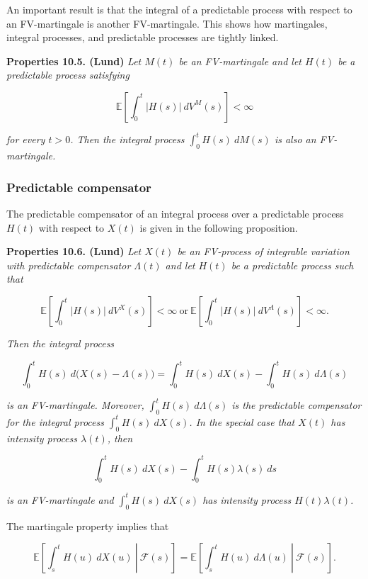 \documentclass[a4paper,10pt,openany]{book}
\begin{document}
An important result is that the integral of a predictable process with respect to an FV-martingale is another FV-martingale. This shows how martingales, integral processes, and predictable processes are tightly linked.

\textbf{Properties 10.5. (Lund)} \emph{Let \(M(t)\) be an FV-martingale and let \(H(t)\) be a predictable process satisfying}

\[
\mathbb E\left[\int_0^t\vert H(s)\vert\ dV^M(s)\right]< \infty
\]

\emph{for every \(t>0\). Then the integral process \(\int_0^t H(s)\ dM(s)\) is also an FV-martingale.}

\hypertarget{predictable-compensator}{%
\subsubsection{Predictable compensator}\label{predictable-compensator}}

The predictable compensator of an integral process over a predictable process \(H(t)\) with respect to \(X(t)\) is given in the following proposition.

\textbf{Properties 10.6. (Lund)} \emph{Let \(X(t)\) be an FV-process of integrable variation with predictable compensator \(\Lambda(t)\) and let \(H(t)\) be a predictable process such that}

\[
\mathbb E\left[\int_0^t\vert H(s)\vert\ dV^X(s)\right]< \infty\ \text{or}\ \mathbb E\left[\int_0^t\vert H(s)\vert\ dV^\Lambda(s)\right]< \infty.
\]

\emph{Then the integral process}

\[
\int_0^t H(s)\ d\Big(X(s)-\Lambda(s)\Big)=\int_0^t H(s)\ dX(s)-\int_0^t H(s)\ d\Lambda(s)
\]

\emph{is an FV-martingale. Moreover, \(\int_0^t H(s)\ d\Lambda(s)\) is the predictable compensator for the integral process \(\int_0^t H(s)\ dX(s)\). In the special case that \(X(t)\) has intensity process \(\lambda(t)\), then}

\[
\int_0^t H(s)\ dX(s)-\int_0^t H(s)\lambda(s)\ ds
\]

\emph{is an FV-martingale and \(\int_0^t H(s)\ dX(s)\) has intensity process \(H(t)\lambda (t)\).}

The martingale property implies that

\[
\mathbb E\left[\left.\int_s^t H(u)\ dX(u)\ \right\vert\ \mathcal F(s)\right]=\mathbb E\left[\left.\int_s^t H(u)\ d\Lambda (u)\ \right\vert\ \mathcal F(s)\right].
\]
\end{document}

